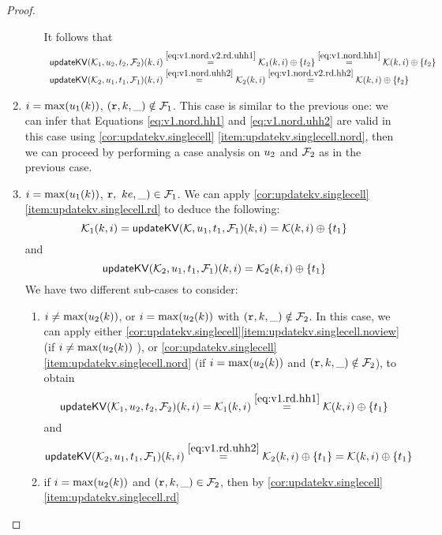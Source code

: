 \begin{proof}
\begin{enumerate}
\begin{enumerate}
It follows that 
\[
\begin{array}{l}
\updateKV(\hh_1, \vi_2, \txid_2, \opset_2)(\ke, i) \stackrel{\cref{eq:v1.nord.v2.rd.uhh1}}{=} \hh_1(\ke, i) \oplus \{\txid_2 \} \stackrel{\cref{eq:v1.nord.hh1}}{=} \hh(\ke, i) \oplus \{\txid_2\}\\
\updateKV(\hh_2,\vi_1, \txid_1,\opset_1)(\ke, i) \stackrel{\cref{eq:v1.nord.uhh2}}{=} \hh_2(\ke, i) \stackrel{\cref{eq:v1.nord.v2.rd.hh2}}{=} \hh(\ke, i) \oplus \{\txid_2\}
\end{array}
\]
\end{enumerate}
\item $i = \max(u_1(k))$, $(\textnormal{\texttt r}, k, \_) \notin \mathcal{F}_1$. This case is similar to the previous one: we can infer 
that Equations \cref{eq:v1.nord.hh1} and \cref{eq:v1.nord.uhh2} are valid in this case using \cref{cor:updatekv.singlecell}
\cref{item:updatekv.singlecell.nord}, then we can proceed by performing a case analysis on $u_2$ and $\mathcal{F}_2$ as in the previous case.
\item $i = \max(u_1(k))$, $\textnormal{\texttt r},\ ke, \_) \in \mathcal{F}_1$. We can apply \cref{cor:updatekv.singlecell}\cref{item:updatekv.singlecell.rd} 
to deduce the following: 
\begin{equation}
\mathcal{K}_1(k, i) = \mathsf{updateKV}(\mathcal{K}, u_1, t_1, \mathcal{F}_1)(k, i) = \mathcal{K}(k, i) \oplus \{t_1\}
\label{eq:v1.rd.hh1}
\end{equation}
and
\begin{equation}
\mathsf{updateKV}(\mathcal{K}_2, u_1, t_1, \mathcal{F}_1)(k, i) = \mathcal{K}_2(k, i) \oplus \{t_1\}
\label{eq:v1.rd.uhh2}
\end{equation}
We have two different sub-cases to consider: 
\begin{enumerate}
\item $i \neq \max(u_2(k))$, or $i = \max(u_2(k))$ with $(\textnormal{\texttt r},k,\_) \notin \mathcal{F}_2$. In this case, we can apply either 
\cref{cor:updatekv.singlecell}\cref{item:updatekv.singlecell.noview} (if $i \neq \max(u_2(k))$ ), or 
\cref{cor:updatekv.singlecell} \cref{item:updatekv.singlecell.nord} (if $i = \max(u_2(k))$ and $(\textnormal{\texttt r}, k, \_) \notin \mathcal{F}_2$), 
to obtain 
\[
\updateKV(\hh_1, \vi_2, \txid_2, \opset_2)(\ke, i) = \hh_1(\ke, i) \stackrel{\cref{eq:v1.rd.hh1}}{=} \hh(\ke, i) \oplus \{\txid_1\}
\]
and
\[
\updateKV(\hh_2, \vi_1, \txid_1, \opset_1)(\ke, i) \stackrel{\cref{eq:v1.rd.uhh2}}{=} \hh_2(\ke, i) \oplus \{ \txid_1 \} = 
\hh(\ke, i) \oplus \{ \txid_1 \}
\]
\item if $i = \max(u_2(k))$ and $(\textnormal{\texttt r}, k, \_) \in \mathcal{F}_2$, then by \cref{cor:updatekv.singlecell}\cref{item:updatekv.singlecell.rd} 

\end{enumerate}
\end{enumerate}
\end{proof}
